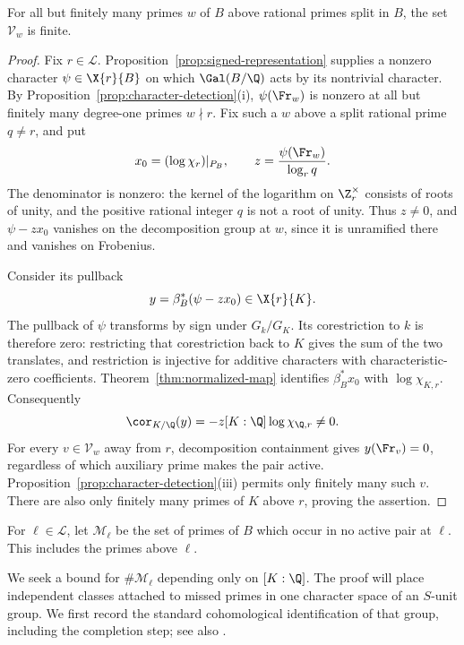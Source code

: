 \begin{lemma}\label{lem:finite-fibers}
For all but finitely many primes $w$ of $B$ above rational primes split in $B$, the set $\mathcal V_w$ is finite.
\end{lemma}
\begin{proof}
Fix $r\in\mathcal L$. Proposition~\ref{prop:signed-representation} supplies a nonzero character $\psi\in\X{r}{B}$ on which $\Gal(B/\Q)$ acts by its nontrivial character. By Proposition~\ref{prop:character-detection}(i), $\psi(\Fr_w)$ is nonzero at all but finitely many degree-one primes $w\nmid r$. Fix such a $w$ above a split rational prime $q\ne r$, and put
\[
 x_0=(\log\chi_r)|_{P_B},\qquad
 z=\frac{\psi(\Fr_w)}{\log_r q}.
\]
The denominator is nonzero: the kernel of the logarithm on $\Z_r^\times$ consists of roots of unity, and the positive rational integer $q$ is not a root of unity. Thus $z\ne0$, and $\psi-zx_0$ vanishes on the decomposition group at $w$, since it is unramified there and vanishes on Frobenius.

Consider its pullback
\[
 y=\beta_B^*(\psi-zx_0)\in\X{r}{K}.
\]
The pullback of $\psi$ transforms by sign under $G_k/G_K$. Its corestriction to $k$ is therefore zero: restricting that corestriction back to $K$ gives the sum of the two translates, and restriction is injective for additive characters with characteristic-zero coefficients. Theorem~\ref{thm:normalized-map} identifies $\beta_B^*x_0$ with $\log\chi_{K,r}$. Consequently
\[
 \cor_{K/\Q}(y)
 =-z[K:\Q]\log\chi_{\Q,r}\ne0.
\]
For every $v\in\mathcal V_w$ away from $r$, decomposition containment gives $y(\Fr_v)=0$, regardless of which auxiliary prime makes the pair active. Proposition~\ref{prop:character-detection}(iii) permits only finitely many such $v$. There are also only finitely many primes of $K$ above $r$, proving the assertion.
\end{proof}

For $\ell\in\mathcal L$, let $\mathcal M_\ell$ be the set of primes of $B$ which occur in no active pair at $\ell$. This includes the primes above $\ell$.

We seek a bound for $\#\mathcal M_\ell$ depending only on $[K:\Q]$. The proof will place independent classes attached to missed primes in one character space of an $S$-unit group. We first record the standard cohomological identification of that group, including the completion step; see also \cite{neukirch1999}.

